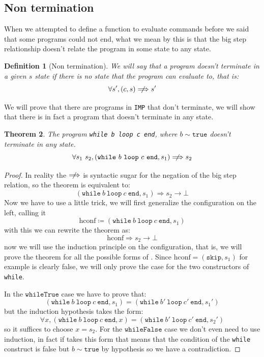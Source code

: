 \documentclass[
  a4paper, 
  10pt, 
  parskip=half, 
  DIV=20,
  toc=bibliography,
  usegeometry,
]{scrartcl}
\newtheorem{theorem}{Theorem}[section]
\newtheorem{definition}[theorem]{Definition}
\newcommand{\funfont}[1]{\text{#1}}
\renewcommand{\implies}{\rightarrow}
\newcommand{\bigstep}{\Longrightarrow}
\begin{document}
\subsection{Non termination}

When we attempted to define a \funfont{eval} function to evaluate commands before
we said that some programs could not end, what we mean by this is that the
big step relationship doesn't relate the program in some state to any state.

\begin{definition}[Non termination]
  We will say that a program doesn't terminate in a given \(s\) state if there 
  is no state that the program can evaluate to, that is:
  \[
   \forall s', (c, s) \centernot \bigstep s'
  \]
\end{definition}

We will prove that there are programs in \texttt{IMP} that don't terminate,
we will show that there is in fact a program that doesn't terminate in any
state.

\begin{theorem}\label{thm:non_termination}
  The program \texttt{while b loop c end}, where \(b \sim \texttt{true}\)
  doesn't terminate in any state.
  \[
  \forall s_1 \ s_2, (\texttt{while} \ b \ \texttt{loop} \ c \ \texttt{end}, s_1) \centernot \bigstep s_2
  \]
\end{theorem}

\begin{proof}
  In reality the \(\centernot \bigstep\) is syntactic sugar for
  the negation of the big step relation, so the theorem is equivalent to:
  \[
  (\texttt{while} \ b \ \texttt{loop} \ c \ \texttt{end}, s_1) \bigstep s_2 \implies \bot
  \]
  Now we have to use a little trick, we will first generalize the configuration on the
  left, calling it 
  \[\text{hconf} \coloneqq (\texttt{while} \ b \ \texttt{loop} \ c \ \texttt{end}, s_1)\] 
  with this we can rewrite the theorem as:
  \[
  \text{hconf} \bigstep s_2 \implies \bot
  \]
  now we will use the induction principle on the configuration, that is, we will
  prove the theorem for all the possible forms of . Since
  \(\text{hconf} = (\texttt{skip}, s_1)\) for example is clearly false, we will only
  prove the case for the two constructors of \texttt{while}.

  In the \(\texttt{whileTrue}\) case we have to prove that:
  \[
    (\texttt{while} \ b \ \texttt{loop} \ c \ \texttt{end}, s_1) = (\texttt{while} \ b' \ \texttt{loop} \ c' \ \texttt{end}, s_1')
  \]
  but the induction hypothesis takes the form:
  \[
    \forall x, (\texttt{while} \ b \ \texttt{loop} \ c \ \texttt{end}, x) = (\texttt{while} \ b' \ \texttt{loop} \ c' \ \texttt{end}, s_2')
  \]
  so it suffices to choose \(x = s_2\). For the \(\texttt{whileFalse}\) case we 
  don't even need to use induction, in fact if  takes this form
  that means that the condition of the \texttt{while} construct is false but
  \(b \sim \texttt{true}\) by hypothesis so we have a contradiction.
\end{proof}
\end{document}
